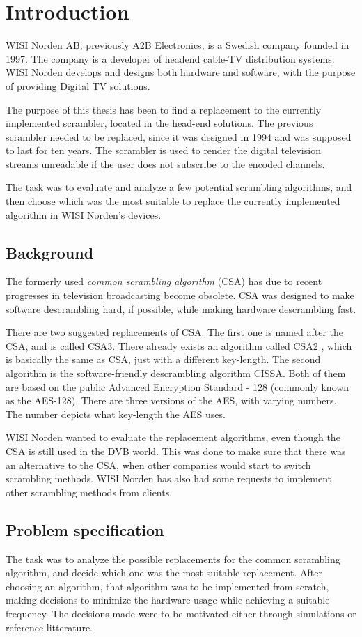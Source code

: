 \chapter{Introduction}
WISI Norden AB, previously A2B Electronics, is a Swedish company 
founded in 1997. The company is a developer of headend cable-TV 
distribution systems. WISI Norden develops and designs both hardware and
software, with the purpose of providing Digital TV solutions. 

The purpose of this thesis has been to find a replacement to the 
currently implemented scrambler, located in the head-end solutions. The 
previous scrambler needed to be replaced, since it was designed in 
1994 and was supposed to last for ten years. The scrambler is used to 
render the digital television streams unreadable if the user does not 
subscribe to the encoded channels.

The task was to evaluate and analyze a few potential scrambling 
algorithms, and then choose which was the most suitable to replace the 
currently implemented algorithm in WISI Norden's devices.

\section{Background}
The formerly used \emph{common scrambling algorithm} (CSA) has due to 
recent progresses in television broadcasting become obsolete. CSA was 
designed to make software descrambling hard, if possible, while making 
hardware descrambling fast. 

There are two suggested replacements of CSA. The first one is named 
after the CSA, and is called CSA3. There already exists an algorithm 
called CSA2 , which is basically the same as CSA, just with a different 
key-length. The second algorithm is the software-friendly descrambling 
algorithm CISSA. Both of them are based on the public Advanced 
Encryption Standard - 128 (commonly known as the AES-128). There are 
three versions of the AES, with varying numbers. The number depicts 
what key-length the AES uses.

WISI Norden wanted to evaluate the replacement algorithms, even 
though the CSA is still used in the DVB world. This was done to make 
sure that there was an alternative to the CSA, when other companies 
would start to switch scrambling methods. WISI Norden has also had some 
requests to implement other scrambling methods from clients.

\section{Problem specification}
The task was to analyze the possible replacements for the common 
scrambling algorithm, and decide which one was the most suitable 
replacement. After choosing an algorithm, that algorithm was to be 
implemented from scratch, making decisions to minimize the hardware 
usage while achieving a suitable frequency. The decisions made were to 
be motivated either through simulations or reference litterature.

